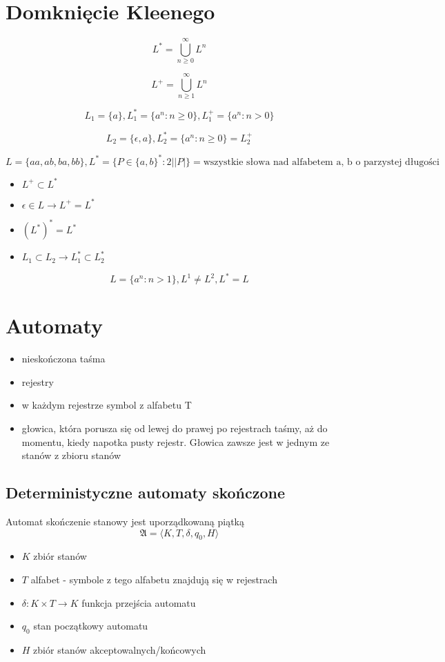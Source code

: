 \documentclass{../notatki}
\begin{document}
\section{Domknięcie Kleenego}

$$
L^* = \bigcup_{n \ge 0}^{\infty}L^n
$$

$$
L^+ = \bigcup_{n \ge 1}^{\infty}L^n
$$

$$
L_1 = \{a\}, L_1^* = \{a^n : n \ge 0\}, L_1^+ = \{a^n : n > 0\}
$$

$$
L_2 = \{\epsilon, a\}, L_2^* = \{a^n : n \ge 0\} = L_2^+
$$

$$
L = \{aa, ab, ba, bb\}, L^* = \{P \in \{a, b\}^* : 2 | |P|\} = \text{wszystkie słowa nad alfabetem {a, b} o parzystej długości}
$$

\begin{itemize}
    \item $L^+ \subset L^*$
    \item $\epsilon \in L \rightarrow L^+ = L^*$
    \item $(L^*)^* = L^*$
    \item $L_1 \subset L_2 \rightarrow L_1^* \subset L_2^*$
\end{itemize}

$$
L = \{a^n : n > 1\}, L^1 \ne L^2, L^* = L
$$

\section{Automaty}

\begin{itemize}
    \item nieskończona taśma
    \item rejestry
    \item w każdym rejestrze symbol z alfabetu T
    \item głowica, która porusza się od lewej do prawej po rejestrach taśmy, aż do momentu, kiedy napotka pusty rejestr. Głowica zawsze jest w jednym ze stanów z zbioru stanów
\end{itemize}

\subsection{Deterministyczne automaty skończone}

Automat skończenie stanowy jest uporządkowaną piątką 
$$
\mathfrak{A} = \langle K,T,\delta,q_0,H \rangle 
$$

\begin{itemize}
    \item $K$   zbiór stanów
    \item $T$   alfabet - symbole z tego alfabetu znajdują się w rejestrach
    \item $\delta: K \times T \rightarrow K$  funkcja przejścia automatu
    \item $q_0$ stan początkowy automatu
    \item $H$ zbiór stanów akceptowalnych/końcowych
\end{itemize}
\end{document}
